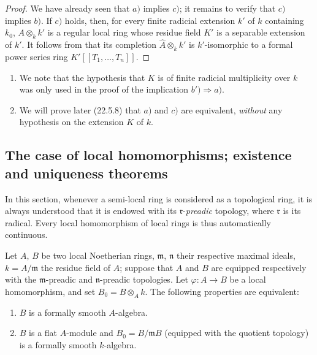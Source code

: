 \begin{proof}
We have already seen  that $a)$ implies $c)$; it remains to verify that $c)$ implies $b)$.
If $c)$ holds, then, for every finite radicial extension $k'$ of $k$ containing $k_0$, $A\otimes_k k'$ is a regular local ring whose residue field $K'$ is a separable extension of $k'$.
It follows from  that its completion
$\widehat{A}\otimes_k k'$ is $k'$-isomorphic to a formal power series ring
$K'[[T_1,\ldots,T_n]]$.
\end{proof}

\begin{remarks}[19.6.7]
\label{0.19.6.7}
\begin{enumerate}
  \item[\rm(i)] We note that the hypothesis that $K$ is of finite radicial multiplicity over $k$ was only used in the proof of the implication $b')\Rightarrow a)$.
  \item[\rm(ii)] We will prove later (22.5.8) that $a)$ and $c)$ are equivalent, \emph{without} any hypothesis on the extension $K$ of $k$.
\end{enumerate}
\end{remarks}

\subsection{The case of local homomorphisms; existence and uniqueness theorems}
\label{subsection:0.19.7}

In this section, whenever a semi-local ring is considered as a topological ring, it is always understood that it is endowed with its $\mathfrak{r}$-\emph{preadic} topology, where $\mathfrak{r}$ is its radical. Every local homomorphism of local rings is thus automatically continuous.

\begin{theorem}[19.7.1]
\label{0.19.7.1}
Let $A$, $B$ be two local Noetherian rings, $\mathfrak{m}$, $\mathfrak{n}$ their respective maximal ideals, $k=A/\mathfrak{m}$ the residue field of $A$; suppose that $A$ and $B$ are equipped respectively with the $\mathfrak{m}$-preadic and $\mathfrak{n}$-preadic topologies.
Let $\varphi:A\to B$ be a local homomorphism, and set $B_0=B\otimes_A k$.
The following properties are equivalent:
\begin{enumerate}
  \item[\rm a)] $B$ is a formally smooth $A$-algebra.
  \item[\rm b)] $B$ is a flat $A$-module and $B_0=B/\mathfrak{m}B$ (equipped with the quotient topology) is a formally smooth $k$-algebra.
\end{enumerate}
\end{theorem}

